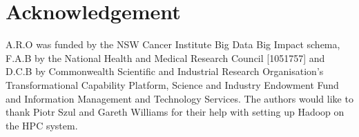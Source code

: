 \documentclass{bioinfo}
\begin{document}
\section*{Acknowledgement}
A.R.O was funded by the NSW Cancer Institute Big Data Big Impact schema, F.A.B by the National Health and Medical Research Council [1051757] and D.C.B by Commonwealth Scientific and Industrial Research Organisation's Transformational Capability Platform, Science and Industry Endowment Fund and Information Management and Technology Services.
The authors would like to thank Piotr Szul and Gareth Williams for their help with setting up Hadoop on the HPC system.  


%
%
%
%
  
\end{document}
